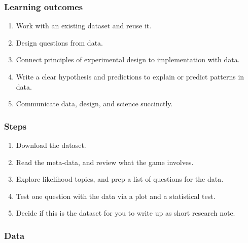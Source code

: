 \documentclass[
]{book}
\providecommand{\tightlist}{%
  \setlength{\itemsep}{0pt}\setlength{\parskip}{0pt}}
\begin{document}
\hypertarget{learning-outcomes-3}{%
\subsubsection*{Learning outcomes}\label{learning-outcomes-3}}

\begin{enumerate}
\def\labelenumi{\arabic{enumi}.}
\tightlist
\item
  Work with an existing dataset and reuse it.\\
\item
  Design questions from data.\\
\item
  Connect principles of experimental design to implementation with data.\\
\item
  Write a clear hypothesis and predictions to explain or predict patterns in data.\\
\item
  Communicate data, design, and science succinctly.
\end{enumerate}

\hypertarget{steps-3}{%
\subsubsection*{Steps}\label{steps-3}}

\begin{enumerate}
\def\labelenumi{\arabic{enumi}.}
\tightlist
\item
  Download the dataset.\\
\item
  Read the meta-data, and review what the game involves.\\
\item
  Explore likelihood topics, and prep a list of questions for the data.
\item
  Test one question with the data via a plot and a statistical test.\\
\item
  Decide if this is the dataset for you to write up as short research note.
\end{enumerate}

\hypertarget{data-3}{%
\subsubsection*{Data}\label{data-3}}
\end{document}
